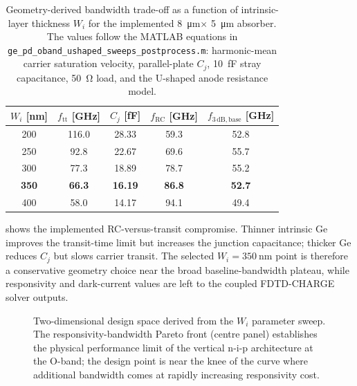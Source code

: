 \begin{table}[H]
\centering
\caption{Geometry-derived bandwidth trade-off as a function of intrinsic-layer
thickness $W_i$ for the implemented \SI{8}{\micro\metre}$\times$
\SI{5}{\micro\metre} absorber. The values follow the MATLAB equations in
\texttt{ge\_pd\_oband\_ushaped\_sweeps\_postprocess.m}: harmonic-mean carrier
saturation velocity, parallel-plate $C_j$, \SI{10}{\femto\farad} stray
capacitance, \SI{50}{\ohm} load, and the U-shaped anode resistance model.}
\label{tab:wi_sweep}
\footnotesize
\begin{tabular*}{\linewidth}{@{\extracolsep{\fill}}ccccc@{}}
\toprule
$W_i$ [nm] & $f_{\mathrm{tt}}$ [GHz] & $C_j$ [fF] & $f_{\mathrm{RC}}$ [GHz] &
$f_{3\,\mathrm{dB,base}}$ [GHz] \\
\midrule
200 & 116.0 & 28.33 & 59.3 & 52.8 \\
250 & 92.8 & 22.67 & 69.6 & 55.7 \\
300 & 77.3 & 18.89 & 78.7 & 55.2 \\
\textbf{350} & \textbf{66.3} & \textbf{16.19} & \textbf{86.8} & \textbf{52.7} \\
400 & 58.0 & 14.17 & 94.1 & 49.4 \\
\bottomrule
\end{tabular*}
\end{table}

 shows the implemented RC-versus-transit compromise. Thinner
intrinsic Ge improves the transit-time limit but increases the junction
capacitance; thicker Ge reduces $C_j$ but slows carrier transit. The selected
$W_i=\SI{350}{\nano\metre}$ point is therefore a conservative geometry choice
near the broad baseline-bandwidth plateau, while responsivity and dark-current
values are left to the coupled FDTD-CHARGE solver outputs.

\begin{figure}[H]
    \centering
    \caption{Two-dimensional design space derived from the $W_i$ parameter
    sweep. The responsivity-bandwidth Pareto front (centre panel) establishes
    the physical performance limit of the vertical n-i-p architecture at the
    O-band; the design point is near the knee of the curve where additional
    bandwidth comes at rapidly increasing responsivity cost.}
    \label{fig:wi_tradeoff}
\end{figure}

